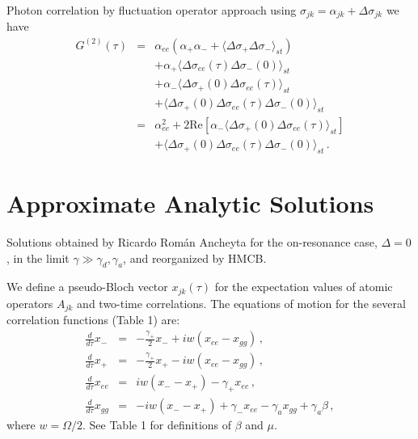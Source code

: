 \documentclass[twocolumn,aps,eqsecnum,showkeys,amsmath]{revtex4-2}
\begin{document}
Photon correlation by fluctuation operator approach using 
$\sigma_{jk} = \alpha_{jk} + \Delta \sigma_{jk}$ we have
%
\begin{eqnarray*} 
G^{(2)} (\tau) &=& \alpha_{ee} \left( \alpha_{+} \alpha_{-} 
	+\langle \Delta \sigma_{+}\Delta \sigma_{-} \rangle_{st} \right) 	\\ 
	&& +\alpha_+ \langle \Delta \sigma_{ee} (\tau) 	
		\Delta \sigma_{-}(0) \rangle_{st} 	\\
	&& +\alpha_- \langle \Delta \sigma_{+} (0) 	
		\Delta \sigma_{ee}(\tau) \rangle_{st}		\\ 
	&& +\langle \Delta \sigma_{+}(0) \Delta \sigma_{ee} (\tau)  	
 	\Delta \sigma_{-}(0) \rangle_{st} 		\\ 
%
&=& \alpha_{ee}^2  +2 \mathrm{Re} \left[ \alpha_-  \langle 
	\Delta \sigma_{+} (0) \Delta \sigma_{ee}(\tau) \rangle_{st} \right] \\ 
 &&  +\langle \Delta \sigma_{+}(0) \Delta \sigma_{ee} (\tau)  	
 	\Delta \sigma_{-}(0) \rangle_{st} \,.	
\end{eqnarray*}

\section{Approximate Analytic Solutions} 
Solutions obtained by Ricardo Rom\'an Ancheyta for the on-resonance 
case, $\Delta=0$, in the limit $\gamma \gg \gamma_d, \gamma_a$, 
and reorganized by HMCB. 

We define a pseudo-Bloch vector $x_{jk} (\tau)$ for the expectation 
values of atomic operators $A_{jk}$ and two-time correlations. The 
equations of motion for the several correlation functions (Table 1) are:  
%
\begin{eqnarray*} 	
\frac{d}{d\tau} x_-  
&=& -\frac{\gamma_+}{2}  x_- 	+i w ( x_{ee}	- x_{gg} )		\,, \\
%
\frac{d}{d\tau}  x_+
&=& -\frac{\gamma_+}{2} x_+ 	-i w ( x_{ee} 	- x_{gg} ) 		\,,	\\
%
\frac{d}{d\tau} x_{ee}  
&=& i w ( x_-  - x_+ )	 -\gamma_+ x_{ee} 	\,, \\
%
\frac{d}{d\tau} x_{gg} 
&=& -i w ( x_-  - x_+ )  +\gamma_- x_{ee}    	
	 -\gamma_a x_{gg}   +\gamma_a \beta \,,	
\end{eqnarray*}
where $w=\Omega/2$. See Table 1 for definitions of $\beta$ and $\mu$. 
\end{document}
